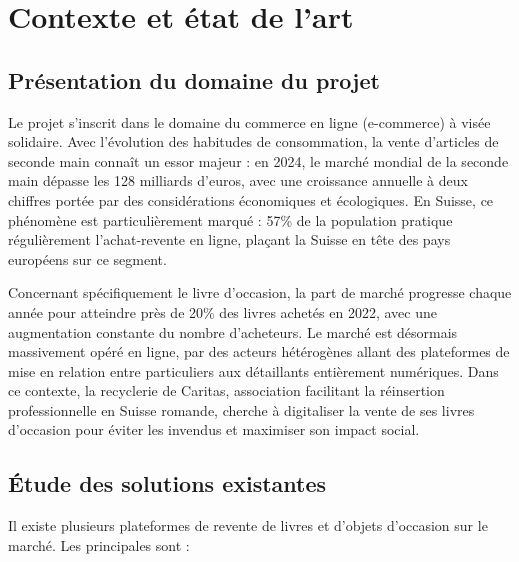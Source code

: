 \documentclass[12pt, a4paper]{report}
\renewcommand{\_}{\origunderscore\allowbreak}
\begin{document}
\chapter{Contexte et état de l'art}

\section{Présentation du domaine du projet}

Le projet s'inscrit dans le domaine du commerce en ligne (e-commerce) à visée solidaire. Avec l'évolution des habitudes de consommation, la vente d'articles de seconde main connaît un essor majeur : en 2024, le marché mondial de la seconde main dépasse les 128 milliards d'euros, avec une croissance annuelle à deux chiffres portée par des considérations économiques et écologiques. En Suisse, ce phénomène est particulièrement marqué : 57\% de la population pratique régulièrement l'achat-revente en ligne, plaçant la Suisse en tête des pays européens sur ce segment.

\noindent Concernant spécifiquement le livre d'occasion, la part de marché progresse chaque année pour atteindre près de 20\% des livres achetés en 2022, avec une augmentation constante du nombre d'acheteurs. Le marché est désormais massivement opéré en ligne, par des acteurs hétérogènes allant des plateformes de mise en relation entre particuliers aux détaillants entièrement numériques. Dans ce contexte, la recyclerie de Caritas, association facilitant la réinsertion professionnelle en Suisse romande, cherche à digitaliser la vente de ses livres d'occasion pour éviter les invendus et maximiser son impact social.

\section{Étude des solutions existantes}

Il existe plusieurs plateformes de revente de livres et d'objets d'occasion sur le marché. Les principales sont :
\end{document}
